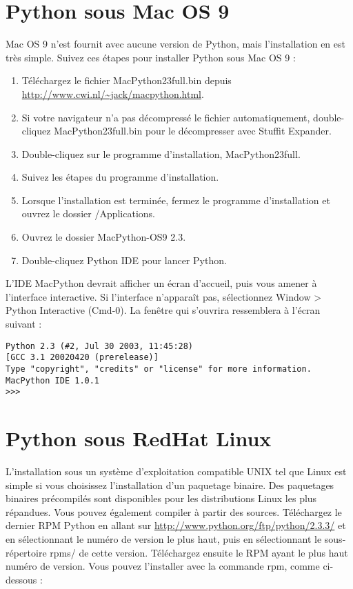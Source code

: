 \section{Python sous Mac OS 9}\label{Python sous Mac OS 9}

Mac OS 9 n'est fournit avec aucune version de Python, mais l'installation en est très simple. Suivez ces étapes pour installer Python sous Mac OS 9 :

\begin{enumerate}
    \item{Téléchargez le fichier MacPython23full.bin depuis \url{http://www.cwi.nl/~jack/macpython.html}.}
    \item{Si votre navigateur n'a pas décompressé le fichier automatiquement, double-cliquez MacPython23full.bin pour le décompresser avec Stuffit Expander.}
    \item{Double-cliquez sur le programme d'installation, MacPython23full.}
    \item{Suivez les étapes du programme d'installation.}
    \item{Lorsque l'installation est terminée, fermez le programme d'installation et  ouvrez le dossier /Applications.}
    \item{Ouvrez le dossier MacPython-OS9 2.3.}
    \item{Double-cliquez Python IDE pour lancer Python.}
\end{enumerate}

\medskip
L'IDE MacPython devrait afficher un écran d'accueil, puis vous amener à l'interface interactive. Si l'interface n'apparaît pas, sélectionnez Window > Python Interactive (Cmd-0). La fenêtre qui s'ouvrira ressemblera à l'écran suivant :

\begin{lstlisting}[style=none]
Python 2.3 (#2, Jul 30 2003, 11:45:28)
[GCC 3.1 20020420 (prerelease)]
Type "copyright", "credits" or "license" for more information.
MacPython IDE 1.0.1
>>>
\end{lstlisting}

\section{Python sous RedHat Linux}\label{Python sous RedHat Linux}

L'installation sous un système d'exploitation compatible UNIX tel que Linux est simple si vous choisissez l'installation d'un paquetage binaire. Des paquetages binaires précompilés sont disponibles pour les distributions Linux les plus répandues. Vous pouvez également compiler à partir des sources.
Téléchargez le dernier RPM Python en allant sur \url{http://www.python.org/ftp/python/2.3.3/} et en sélectionnant le numéro de version le plus haut, puis en sélectionnant le sous-répertoire rpms/ de cette version. Téléchargez ensuite le RPM ayant le plus haut numéro de version. Vous pouvez l'installer avec la commande rpm, comme ci-dessous :

